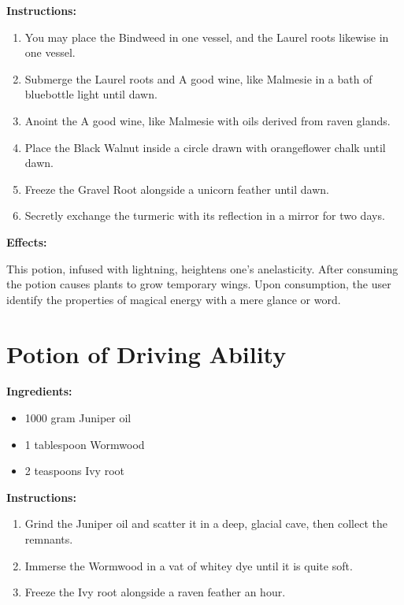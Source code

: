 \documentclass{article}
\begin{document}
\textbf{Instructions:}

\begin{enumerate}
  \item You may place the Bindweed in one vessel, and the Laurel roots likewise in one vessel.
  \item Submerge the Laurel roots and A good wine, like Malmesie in a bath of bluebottle light until dawn.
  \item Anoint the A good wine, like Malmesie with oils derived from raven glands.
  \item Place the Black Walnut inside a circle drawn with orangeflower chalk until dawn.
  \item Freeze the Gravel Root alongside a unicorn feather until dawn.
  \item Secretly exchange the turmeric with its reflection in a mirror for two days.
\end{enumerate}

\textbf{Effects:}

This potion, infused with lightning, heightens one's anelasticity. After consuming the potion causes plants to grow temporary wings. Upon consumption, the user identify the properties of magical energy with a mere glance or word.

\newpage
\section*{Potion of Driving Ability}

\textbf{Ingredients:}

\begin{itemize}
  \item 1000 gram Juniper oil
  \item 1 tablespoon Wormwood
  \item 2 teaspoons Ivy root
\end{itemize}

\textbf{Instructions:}

\begin{enumerate}
  \item Grind the Juniper oil and scatter it in a deep, glacial cave, then collect the remnants.
  \item Immerse the Wormwood in a vat of whitey dye until it is quite soft.
  \item Freeze the Ivy root alongside a raven feather an hour.
\end{enumerate}
\end{document}
